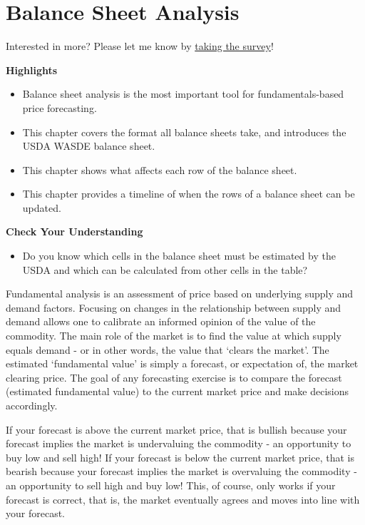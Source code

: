 \documentclass[
  letterpaper,
  DIV=11,
  numbers=noendperiod]{scrreprt}
\providecommand{\tightlist}{%
  \setlength{\itemsep}{0pt}\setlength{\parskip}{0pt}}\usepackage{longtable,booktabs,array}
\begin{document}

\hypertarget{balance-sheet-analysis}{%
\chapter{Balance Sheet Analysis}\label{balance-sheet-analysis}}

{Interested in more? Please let me know by}
\href{https://forms.gle/Q3VByCQZHjfQSy9D7}{taking the survey}!

\textbf{Highlights}

\begin{itemize}
\tightlist
\item
  Balance sheet analysis is the most important tool for
  fundamentals-based price forecasting.
\item
  This chapter covers the format all balance sheets take, and introduces
  the USDA WASDE balance sheet.
\item
  This chapter shows what affects each row of the balance sheet.
\item
  This chapter provides a timeline of when the rows of a balance sheet
  can be updated.
\end{itemize}

\textbf{Check Your Understanding}

\begin{itemize}
\tightlist
\item
  Do you know which cells in the balance sheet must be estimated by the
  USDA and which can be calculated from other cells in the table?
\end{itemize}

Fundamental analysis is an assessment of price based on underlying
supply and demand factors. Focusing on changes in the relationship
between supply and demand allows one to calibrate an informed opinion of
the value of the commodity. The main role of the market is to find the
value at which supply equals demand - or in other words, the value that
`clears the market'. The estimated `fundamental value' is simply a
forecast, or expectation of, the market clearing price. The goal of any
forecasting exercise is to compare the forecast (estimated fundamental
value) to the current market price and make decisions accordingly.

If your forecast is above the current market price, that is bullish
because your forecast implies the market is undervaluing the commodity -
an opportunity to buy low and sell high! If your forecast is below the
current market price, that is bearish because your forecast implies the
market is overvaluing the commodity - an opportunity to sell high and
buy low! This, of course, only works if your forecast is correct, that
is, the market eventually agrees and moves into line with your forecast.
\end{document}
